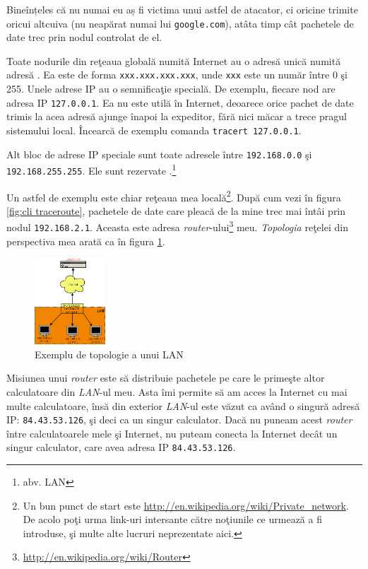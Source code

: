 Bineînțeles că nu numai eu aș fi
victima unui astfel de atacator, ci oricine trimite 
oricui altcuiva (nu neapărat numai lui \texttt{google.com}), atâta timp cât pachetele
de date trec prin nodul controlat de el.

Toate nodurile din reţeaua globală numită Internet au o adresă unică numită adresă
. Ea este de forma \texttt{xxx.xxx.xxx.xxx}, unde \texttt{xxx} este un număr
între 0 şi 255. Unele adrese IP au o semnificaţie specială. De exemplu, fiecare
nod are adresa IP \texttt{127.0.0.1}. Ea nu este utilă în Internet, deoarece orice pachet
de date trimis la acea adresă ajunge înapoi la expeditor, fără nici măcar a trece
pragul sistemului local. Încearcă de exemplu comanda \texttt{tracert 127.0.0.1}.

Alt bloc de adrese IP speciale sunt toate adresele între \texttt{192.168.0.0} şi
\texttt{192.168.255.255}. Ele sunt rezervate .\footnote{abv. LAN}

Un astfel de exemplu este chiar reţeaua mea
locală\footnote{Un bun punct de start este \url{http://en.wikipedia.org/wiki/Private_network}.
De acolo poţi urma link-uri intersante către noţiunile ce urmează a fi introduse,
şi multe alte lucruri neprezentate aici.}.
După cum vezi în figura \ref{fig:cli traceroute},
pachetele de date care pleacă de la mine trec mai întâi prin nodul \texttt{192.168.2.1}.
Aceasta este adresa \textsl{router}-ului\footnote{\url{http://en.wikipedia.org/wiki/Router}}
meu. \textsl{Topologia} reţelei din perspectiva mea
arată ca în figura \ref{fig:topologie}.

\begin{figure}[h]
  \centering
    \includegraphics[width=100px]{cap01/Diagram1.png}
  \caption{Exemplu de topologie a unui LAN}
  \label{fig:topologie}
\end{figure}

Misiunea unui \textsl{router} este să distribuie pachetele
pe care le primeşte altor calculatoare din \textsl{LAN}-ul meu. Asta îmi permite să am acces
la Internet cu mai multe calculatoare, însă din exterior \textsl{LAN}-ul este văzut ca
având o singură adresă IP: \texttt{84.43.53.126}, şi deci ca un singur calculator. Dacă
nu puneam acest \textsl{router} între calculatoarele mele şi Internet, nu puteam conecta
la Internet decât un singur calculator, care avea adresa IP \texttt{84.43.53.126}.

